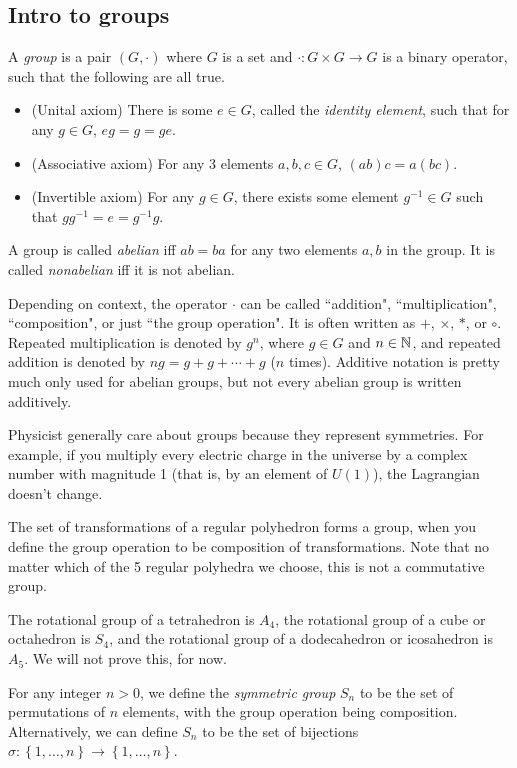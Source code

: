 \documentclass[class=article, crop=false]{standalone}
\begin{document}
\subsection{Intro to groups}
A \emph{group} is a pair $(G, \cdot)$ where $G$ is a set and $\cdot: G \times G \rightarrow G$ is a binary operator, such that the following are all true.
\begin{itemize}
    \item (Unital axiom) There is some $e \in G$, called the \emph{identity element}, such that for any $g \in G$, $eg=g=ge$.
    \item (Associative axiom) For any 3 elements $a,b,c \in G$, $(ab)c=a(bc)$.
    \item (Invertible axiom) For any $g \in G$, there exists some element $g^{-1} \in G$ such that $g g^{-1}=e=g^{-1}g$.
\end{itemize}
\par
A group is called \emph{abelian} iff $ab=ba$ for any two elements $a,b$ in the group. It is called \emph{nonabelian} iff it is not abelian.
\begin{note}
    Depending on context, the operator $\cdot$ can be called ``addition", ``multiplication", ``composition", or just ``the group operation". It is often written as $+$, $\times$, $*$, or $\circ$. Repeated multiplication is denoted by $g^n$, where $g \in G$ and $n \in \mathbb{N}$, and repeated addition is denoted by $ng=g+g+\cdots +g$ ($n$ times). Additive notation is pretty much only used for abelian groups, but not every abelian group is written additively.
\end{note}
Physicist generally care about groups because they represent symmetries. For example, if you multiply every electric charge in the universe by a complex number with magnitude 1 (that is, by an element of $U(1)$), the Lagrangian doesn't change.
\begin{example}
    The set of transformations of a regular polyhedron forms a group, when you define the group operation to be composition of transformations. Note that no matter which of the 5 regular polyhedra we choose, this is not a commutative group.
\end{example}
\begin{prop}
    The rotational group of a tetrahedron is $A_4$, the rotational group of a cube or octahedron is $S_4$, and the rotational group of a dodecahedron or icosahedron is $A_5$. We will not prove this, for now.
\end{prop}
For any integer $n > 0$, we define the \emph{symmetric group} $S_n$ to be the set of permutations of $n$ elements, with the group operation being composition. Alternatively, we can define $S_n$ to be the set of bijections $\sigma: \left\{ 1, \dots, n \right\} \rightarrow \left\{ 1, \dots, n \right\}$.
\end{document}
